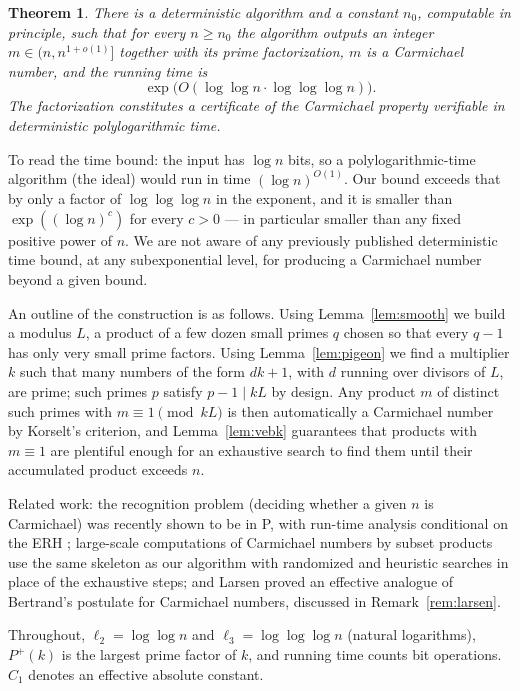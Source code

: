 \documentclass[11pt]{amsart}
\newtheorem*{theoremA}{Theorem}
\newcommand{\llog}{\log\log}
\newcommand{\lllog}{\log\log\log}
\begin{document}
\begin{theoremA}
There is a deterministic algorithm and a constant $n_0$, computable in
principle, such that for every $n \ge n_0$ the algorithm outputs an
integer $m \in (n, n^{1+o(1)}]$ together with its prime factorization,
$m$ is a Carmichael number, and the running time is
\[
\exp\bigl(O(\llog n \cdot \lllog n)\bigr).
\]
The factorization constitutes a certificate of the Carmichael property
verifiable in deterministic polylogarithmic time.
\end{theoremA}

To read the time bound: the input has $\log n$ bits, so a
polylogarithmic-time algorithm (the ideal) would run in time
$(\log n)^{O(1)}$. Our bound exceeds that by only a factor of $\lllog n$
in the exponent, and it is smaller than $\exp((\log n)^{c})$ for every $c>0$ ---
in particular smaller than any fixed positive power of $n$. We are not
aware of any previously published deterministic time bound, at
any subexponential level, for producing a Carmichael number beyond a
given bound.

An outline of the construction is as follows. Using
Lemma~\ref{lem:smooth} we build a modulus $L$, a product of a few dozen
small primes $q$ chosen so that every $q-1$ has only very small prime
factors. Using Lemma~\ref{lem:pigeon} we find a multiplier $k$ such that
many numbers of the form $dk+1$, with $d$ running over divisors of $L$,
are prime; such primes $p$ satisfy $p - 1 \mid kL$ by design. Any
product $m$ of distinct such primes with $m \equiv 1 \pmod{kL}$ is then
automatically a Carmichael number by Korselt's criterion, and
Lemma~\ref{lem:vebk} guarantees that products with $m \equiv 1$ are
plentiful enough for an exhaustive search to find them until their
accumulated product exceeds $n$.

Related work: the recognition problem (deciding whether a
given $n$ is Carmichael) was recently shown to be in P, with run-time
analysis conditional on the ERH \cite{SW};
large-scale computations of Carmichael numbers by subset products
\cite{LN, AGHS} use the same skeleton as our algorithm with randomized
and heuristic searches in place of the exhaustive steps; and Larsen
\cite{Lar} proved an effective analogue of Bertrand's postulate for
Carmichael numbers, discussed in Remark~\ref{rem:larsen}.

Throughout, $\ell_2 = \llog n$ and $\ell_3 = \lllog n$ (natural
logarithms), $P^+(k)$ is the largest prime factor of $k$, and running
time counts bit operations. $C_1$ denotes an effective absolute constant.
\end{document}
